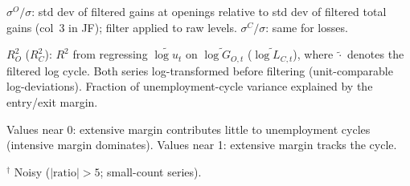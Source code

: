 \begin{table}[htbp]
\begin{tablenotes}[flushleft]
\item $\sigma^O/\sigma$: std dev of filtered gains at openings relative to std dev of filtered total gains (col~3 in JF); filter applied to raw levels. $\sigma^C/\sigma$: same for losses.
\item $R^2_O$ ($R^2_C$): $R^2$ from regressing $\widetilde{\log u_t}$ on $\widetilde{\log G_{O,t}}$ ($\widetilde{\log L_{C,t}}$), where $\widetilde{\cdot}$ denotes the filtered log cycle. Both series log-transformed before filtering (unit-comparable log-deviations). Fraction of unemployment-cycle variance explained by the entry/exit margin.
\item Values near 0: extensive margin contributes little to unemployment cycles (intensive margin dominates). Values near 1: extensive margin tracks the cycle.
\item $^\dagger$ Noisy ($|\text{ratio}|>5$; small-count series).
\end{tablenotes}
\end{table}
